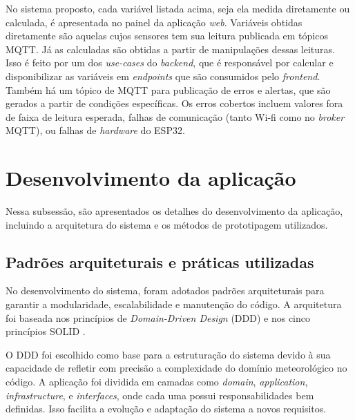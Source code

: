 No sistema proposto, cada variável listada acima, seja ela medida diretamente ou calculada, é apresentada no painel da aplicação \textit{web}. Variáveis obtidas diretamente são aquelas cujos sensores tem sua leitura publicada em tópicos MQTT. Já as calculadas são obtidas a partir de manipulações dessas leituras. Isso é feito por um dos \textit{use-cases} do \textit{backend}, que é responsável por calcular e disponibilizar as variáveis em \textit{endpoints} que são consumidos pelo \textit{frontend}. Também há um tópico de MQTT para publicação de erros e alertas, que são gerados a partir de condições específicas. Os erros cobertos incluem valores fora de faixa de leitura esperada, falhas de comunicação (tanto Wi-fi como no \textit{broker} MQTT), ou falhas de \textit{hardware} do ESP32.

\section{Desenvolvimento da aplicação}
Nessa subsessão, são apresentados os detalhes do desenvolvimento da aplicação, incluindo a arquitetura do sistema e os métodos de prototipagem utilizados.

\subsection{Padrões arquiteturais e práticas utilizadas}

No desenvolvimento do sistema, foram adotados padrões arquiteturais para garantir a modularidade, escalabilidade e manutenção do código. A arquitetura foi baseada nos princípios de \textit{Domain-Driven Design} (DDD) e nos cinco princípios SOLID \parencite{ddd_eric2004}.

O DDD foi escolhido como base para a estruturação do sistema devido à sua capacidade de refletir com precisão a complexidade do domínio meteorológico no código. A aplicação foi dividida em camadas como \textit{domain}, \textit{application}, \textit{infrastructure}, e \textit{interfaces}, onde cada uma possui responsabilidades bem definidas. Isso facilita a evolução e adaptação do sistema a novos requisitos.

